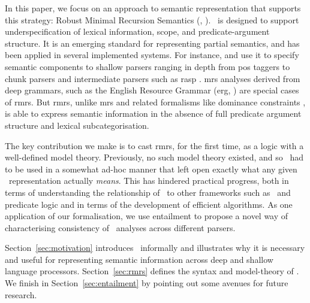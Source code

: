 In this paper, we focus on an approach to
semantic representation that supports this strategy: Robust Minimal
Recursion Semantics (\rmrs, ).
\rmrs\ is designed to support underspecification of lexical information,
scope, and predicate-argument structure.  It is an emerging standard
for representing partial semantics, and has been applied in
several implemented systems.  For instance, 
and  use it to specify semantic components to
shallow parsers ranging in depth from {\sc pos} taggers to chunk
parsers and intermediate parsers such as {\sc rasp}
\cite{briscoe:etal:2006}.  {\sc mrs} analyses
\cite{copestake:etal:2005} derived from deep grammars, such as the
English Resource Grammar ({\sc erg}, \cite{copestake:flickinger:2000})
are special cases of {\sc rmrs}.  But {\sc rmrs}, unlike {\sc mrs} and
related formalisms like dominance constraints \cite{egg:etal:2001}, is
able to express semantic information in the absence of full predicate
argument structure and lexical subcategorisation.

The key contribution we make is to cast {\sc rmrs}, for the first
time, as a logic with a well-defined model theory.  Previously, no
such model theory existed, and so \rmrs\ had to be used in a somewhat
ad-hoc manner that left open exactly what any given \rmrs\
representation actually \emph{means}.  This has hindered 
practical progress, both in terms of understanding the relationship of
\rmrs\ to other frameworks such as \mrs\ and predicate logic and in
terms of the development of efficient algorithms.  As one application
of our formalisation, we use
entailment to propose a
novel way of characterising consistency of \rmrs\ analyses across
different parsers.

Section~\ref{sec:motivation} introduces \rmrs\ informally and
illustrates why it is necessary and useful for representing semantic
information across deep and shallow language processors.
Section~\ref{sec:rmrs} defines the syntax and model-theory of \rmrs.
We finish in Section~\ref{sec:entailment} by pointing out some avenues
for future research. %


